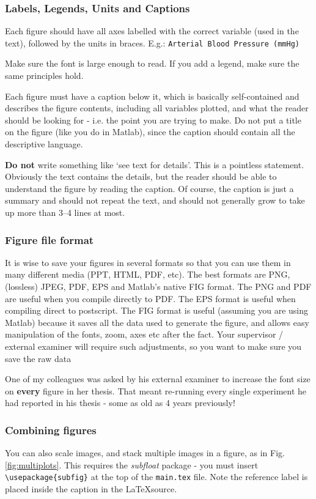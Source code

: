 \subsubsection{Labels, Legends, Units and Captions}
Each figure should have all axes labelled with the correct
variable (used in the text), followed by the units in braces.
\newline
E.g.: \verb|Arterial Blood Pressure (mmHg)|
\par
Make sure the font is large enough to read. 
If you add a legend, make sure the same principles hold.
\par
Each figure must have a caption below it, which is 
basically self-contained and describes the figure contents,
including all variables plotted, and what the reader
should be looking for - i.e. the point you are trying to make.
Do not put a title on the figure (like you do in Matlab), since
the caption should contain all the descriptive language.
\par
{\bf Do not} write something like `see text for details'. This
is a pointless statement. Obviously the text contains the 
details, but the reader should be able to understand the 
figure by reading the caption. Of course, the caption
is just a summary and should not repeat the text, and 
should not generally grow to take up more than 3--4 lines at most.

\subsubsection{Figure file format}

It is wise to save your figures in several formats so that you can 
use them in many different media (PPT, HTML, PDF, etc). 
The best formats are PNG, (lossless) JPEG, PDF, EPS and Matlab's
native FIG format. The PNG and PDF are useful when you compile 
directly to PDF. The EPS format is useful when compiling direct
to postscript. The FIG format is useful (assuming you are using Matlab)
because it saves all the data used to generate the figure, and allows
easy manipulation of the fonts, zoom, axes etc after the fact.
Your supervisor / external examiner will require such adjustments, 
so you want to make sure you save the raw data 

One of my colleagues was asked by his external examiner to increase
the font size on {\bf every} figure in her thesis. That meant re-running
every single experiment he had reported in his thesis - some as old as 4 years previously! 

\subsubsection{Combining figures}
You can also scale images, and stack multiple images in a figure,
as in Fig. \ref{fig:multiplots}. 
This requires the {\it subfloat} package - you must insert \verb|\usepackage{subfig}| at the top of the \verb|main.tex| file.
Note the reference label is
placed inside the caption in the \LaTeX source.

